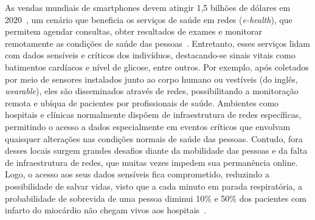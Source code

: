 \documentclass[12pt]{article}
\newcommand{\as}[1]{\textcolor{blue}{{\bf #1}}}
\newcommand{\al}[1]{\textcolor{brown}{{\bf #1}}}
\begin{document}
As
vendas mundiais de smartphones devem atingir 1,5 bilhões de dólares em 2020~\cite{statista2019},
um cenário que beneficia os serviços de saúde em redes (\textit{e-health}), 
que permitem agendar consultas, obter resultados de exames e monitorar remotamente as condições de saúde das pessoas~\cite{gharaibeh2017smart}.
Entretanto,
esses serviços lidam com dados sensíveis e críticos dos indivíduos, destacando-se sinais vitais como batimentos cardíacos e nível de glicose, entre outros.
Por exemplo, após
coletados por meio de sensores instalados junto ao corpo humano ou vestíveis (do inglês, \textit{wearable}), eles são disseminados através de redes, possibilitando a monitoração remota e ubíqua de pacientes por profissionais de saúde. Ambientes  %
como hospitais e clínicas normalmente dispõem de infraestrutura de redes 
específicas, 
permitindo  %
o acesso a
dados especialmente
em  %
eventos
críticos
que 
envolvam quaisquer 
alterações nas condições normais de saúde das pessoas.
Contudo,
fora desses locais 
surgem grandes desafios diante da
mobilidade das pessoas e da falta de infraestrutura de redes,
que muitas vezes impedem
sua permanência
online.
Logo, o acesso aos seus dados sensíveis fica comprometido, reduzindo a possibilidade de salvar vidas,
visto que a cada minuto em parada respiratória, a probabilidade de sobrevida de uma pessoa diminui 10\% e
50\% dos pacientes com infarto do miocárdio não chegam vivos aos hospitais~\cite{pazin2003parada}.



\end{document}
